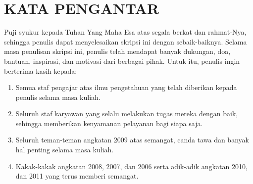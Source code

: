 \chapter*{\normalsize KATA PENGANTAR}

Puji syukur kepada Tuhan Yang Maha Esa atas segala berkat dan rahmat-Nya, sehingga penulis dapat menyelesaikan skripsi ini dengan sebaik-baiknya. Selama masa penulisan skripsi ini, penulis telah mendapat banyak dukungan, doa, bantuan, inspirasi, dan motivasi dari berbagai pihak. Untuk itu, penulis ingin berterima kasih kepada:
\begin{enumerate}
	\item Semua staf pengajar atas ilmu pengetahuan yang telah diberikan kepada penulis selama masa kuliah.
	\item Seluruh staf karyawan yang selalu melakukan tugas mereka dengan baik, sehingga memberikan kenyamanan pelayanan bagi siapa saja.
	\item Seluruh teman-teman angkatan 2009 atas semangat, canda tawa dan banyak hal penting selama masa kuliah.
	\item Kakak-kakak angkatan 2008, 2007, dan 2006 serta adik-adik angkatan 2010, dan 2011 yang terus memberi semangat.
\end{enumerate}

\vspace*{0.1cm}

\begin{flushright}
\penulis \\[0.1cm]
\vspace*{0.2cm}
\tahun
\end{flushright} 